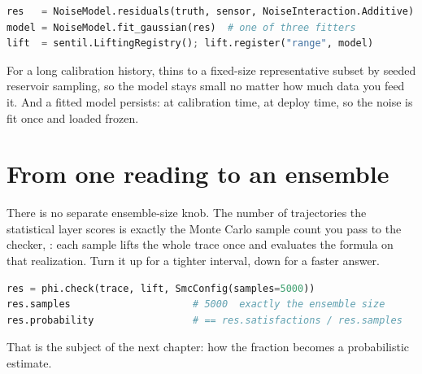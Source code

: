 \begin{lstlisting}[language=Python]
res   = NoiseModel.residuals(truth, sensor, NoiseInteraction.Additive)
model = NoiseModel.fit_gaussian(res)  # one of three fitters
lift  = sentil.LiftingRegistry(); lift.register("range", model)
\end{lstlisting}

For a long calibration history,  thins to a fixed-size representative subset by seeded reservoir sampling, so the model stays small no matter how much data you feed it. And a fitted model persists:  at calibration time,  at deploy time, so the noise is fit once and loaded frozen.

\section{From one reading to an ensemble}

There is no separate ensemble-size knob. The number of trajectories the statistical layer scores is exactly the Monte Carlo sample count you pass to the checker, : each sample lifts the whole trace once and evaluates the formula on that realization. Turn it up for a tighter interval, down for a faster answer.

\begin{lstlisting}[language=Python]
res = phi.check(trace, lift, SmcConfig(samples=5000))
res.samples                     # 5000  exactly the ensemble size
res.probability                 # == res.satisfactions / res.samples
\end{lstlisting}

That is the subject of the next chapter: how the fraction becomes a probabilistic estimate.